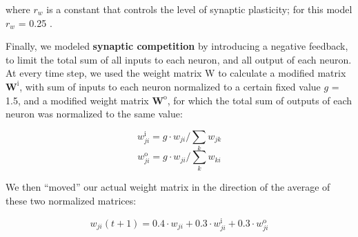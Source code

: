 \documentclass{article}
\begin{document}
where $r_w$ is a constant that controls the level of synaptic plasticity; for this model $r_w$ = 0.25 .

Finally, we modeled \textbf{synaptic competition} by introducing a negative feedback, to limit the total sum of all inputs to each neuron, and all output of each neuron. At every time step, we used the weight matrix W to calculate a modified matrix $\textbf{W}^\text{i}$, with sum of inputs to each neuron normalized to a certain fixed value $g$ = 1.5, and a modified weight matrix $\textbf{W}^\text{o}$, for which the total sum of outputs of each neuron was normalized to the same value: 

$$w_{ji}^\text{i} = g \cdot w_{ji}/\sum_k{w_{jk}}$$
$$w_{ji}^\text{o} = g \cdot w_{ji}/\sum_k{w_{ki}}$$

We then “moved” our actual weight matrix in the direction of the average of these two normalized matrices:

$$w_{ji}(t+1) = 0.4 \cdot w_{ji} + 0.3 \cdot w^\text{i}_{ji} + 0.3 \cdot w^\text{o}_{ji}$$
\end{document}
